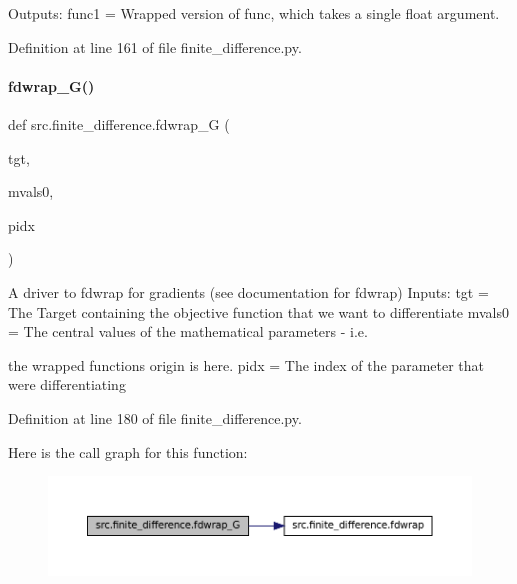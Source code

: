 Outputs\+: func1 = Wrapped version of func, which takes a single float argument. 

Definition at line 161 of file finite\+\_\+difference.\+py.

\mbox{\label{namespacesrc_1_1finite__difference_ad60720d6270fcf96cb4bd2a9957620ed}} 
\paragraph{\texorpdfstring{fdwrap\+\_\+\+G()}{fdwrap\_G()}}
{\footnotesize\ttfamily def src.\+finite\+\_\+difference.\+fdwrap\+\_\+G (\begin{DoxyParamCaption}\item[{}]{tgt,  }\item[{}]{mvals0,  }\item[{}]{pidx }\end{DoxyParamCaption})}



A driver to fdwrap for gradients (see documentation for fdwrap) Inputs\+: tgt = The Target containing the objective function that we want to differentiate mvals0 = The \textquotesingle{}central\textquotesingle{} values of the mathematical parameters -\/ i.\+e. 

the wrapped function\textquotesingle{}s origin is here. pidx = The index of the parameter that we\textquotesingle{}re differentiating 

Definition at line 180 of file finite\+\_\+difference.\+py.

Here is the call graph for this function\+:
\nopagebreak
\begin{figure}[H]
\begin{center}
\leavevmode
\includegraphics[width=350pt]{namespacesrc_1_1finite__difference_ad60720d6270fcf96cb4bd2a9957620ed_cgraph}
\end{center}
\end{figure}
\mbox{\label{namespacesrc_1_1finite__difference_a29e89e33f7fd5acd4569125c0c5f4732}} 
